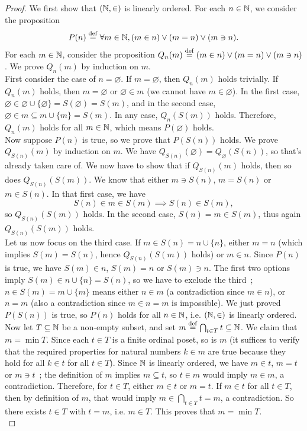 \begin{proof}
    We first show that $(\operatorname{\mathbb N},\in)$ is linearly ordered. For each $n \in \operatorname{\mathbb N}$, we consider the proposition 
    \[
        P(n) \overset{\mathrm{def}}{=} \forall m \in \operatorname{\mathbb N}, (m \in n) \vee (m = n) \vee (m \ni n). 
    \]
    For each $m \in \operatorname{\mathbb N}$, consider the proposition $Q_n(m) \overset{\mathrm{def}}{=} (m \in n) \vee (m = n) \vee (m \ni n)$. We prove $Q_n(m)$ by induction on $m$. 
    \\

    First consider the case of $n = \varnothing$. If $m = \varnothing$, then $Q_n(m)$ holds trivially. If $Q_n(m)$ holds, then $m = \varnothing$ or $\varnothing \in m$ (we cannot have $m \in \varnothing$). In the first case, $\varnothing \in \varnothing \cup \{\varnothing\} = S(\varnothing) = S(m)$, and in the second case, $\varnothing \in m \subseteq m \cup \{m\} = S(m)$. In any case, $Q_n(S(m))$ holds. Therefore, $Q_n(m)$ holds for all $m \in \operatorname{\mathbb N}$, which means $P(\varnothing)$ holds.
    \\

    Now suppose $P(n)$ is true, so we prove that $P(S(n))$ holds. We prove $Q_{S(n)}(m)$ by induction on $m$. We have $Q_{S(n)}(\varnothing) = Q_{\varnothing}(S(n))$, so that's already taken care of. We now have to show that if $Q_{S(n)}(m)$ holds, then so does $Q_{S(n)}(S(m))$. We know that either $m \ni S(n)$, $m = S(n)$ or $m \in S(n)$. In that first case, we have
    \[
        S(n) \in m \in S(m) \implies S(n) \in S(m),
    \]
    so $Q_{S(n)}(S(m))$ holds. In the second case, $S(n) = m \in S(m)$, thus again $Q_{S(n)}(S(m))$ holds. 
    \\
    
    Let us now focus on the third case. If $m \in S(n) = n \cup \{n\}$, either $m = n$ (which implies $S(m) = S(n)$, hence $Q_{S(n)}(S(m))$ holds) or $m \in n$. Since $P(n)$ is true, we have $S(m) \in n$, $S(m) = n$ or $S(m) \ni n$. The first two options imply $S(m) \in n \cup \{n\} = S(n)$, so we have to exclude the third~; $n \in S(m) = m \cup \{m\}$ means either $n \in m$ (a contradiction since $m \in n$), or $n = m$ (also a contradiction since $m \in n = m$ is impossible). We just proved $P(S(n))$ is true, so $P(n)$ holds for all $n \in \operatorname{\mathbb N}$, i.e. $(\operatorname{\mathbb N},\in)$ is linearly ordered. 
    \\
    
    Now let $T \subseteq \operatorname{\mathbb N}$ be a non-empty subset, and set $m \overset{\mathrm{def}}{=} \bigcap_{t \in T} t \subseteq \operatorname{\mathbb N}$. We claim that $m = \min T$. Since each $t \in T$ is a finite ordinal poset, so is $m$ (it suffices to verify that the required properties for natural numbers $k \in m$ are true because they hold for all $k \in t$ for all $t \in T$). Since $\operatorname{\mathbb N}$ is linearly ordered, we have $m \in t$, $m=t$ or $m \ni t$~; the definition of $m$ implies $m \subseteq t$, so $t \in m$ would imply $m \in m$, a contradiction. Therefore, for $t \in T$, either $m \in t$ or $m = t$. If $m \in t$ for all $t \in T$, then by definition of $m$, that would imply $m \in \bigcap_{t \in T} t = m$, a contradiction. So there exists $t \in T$ with $t = m$, i.e. $m \in T$. This proves that $m = \min T$.  
    \\


\end{proof}
